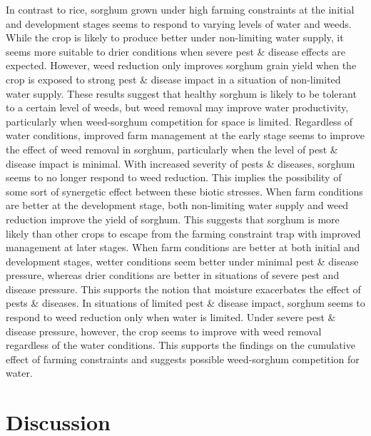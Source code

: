 \documentclass[]{elsarticle} %
\begin{document}
In contrast to rice, sorghum grown under high farming constraints at the initial and development stages seems to respond to varying levels of water and weeds. While the crop is likely to produce better under non-limiting water supply, it seems more suitable to drier conditions when severe pest \& disease effects are expected. However, weed reduction only improves sorghum grain yield when the crop is exposed to strong pest \& disease impact in a situation of non-limited water supply. These results suggest that healthy sorghum is likely to be tolerant to a certain level of weeds, but weed removal may improve water productivity, particularly when weed-sorghum competition for space is limited. Regardless of water conditions, improved farm management at the early stage seems to improve the effect of weed removal in sorghum, particularly when the level of pest \& disease impact is minimal. With increased severity of pests \& diseases, sorghum seems to no longer respond to weed reduction. This implies the possibility of some sort of synergetic effect between these biotic stresses. When farm conditions are better at the development stage, both non-limiting water supply and weed reduction improve the yield of sorghum. This suggests that sorghum is more likely than other crops to escape from the farming constraint trap with improved management at later stages. When farm conditions are better at both initial and development stages, wetter conditions seem better under minimal pest \& disease pressure, whereas drier conditions are better in situations of severe pest and disease pressure. This supports the notion that moisture exacerbates the effect of pests \& diseases. In situations of limited pest \& disease impact, sorghum seems to respond to weed reduction only when water is limited. Under severe pest \& disease pressure, however, the crop seems to improve with weed removal regardless of the water conditions. This supports the findings on the cumulative effect of farming constraints and suggests possible weed-sorghum competition for water.

\hypertarget{ref5}{%
\section{Discussion}\label{ref5}}
\end{document}
